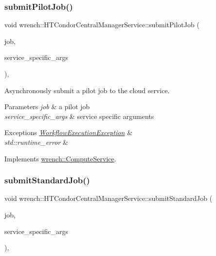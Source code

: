 \subsubsection{\texorpdfstring{submit\+Pilot\+Job()}{submitPilotJob()}}
{\footnotesize\ttfamily void wrench\+::\+H\+T\+Condor\+Central\+Manager\+Service\+::submit\+Pilot\+Job (\begin{DoxyParamCaption}\item[{\hyperlink{classwrench_1_1_pilot_job}{Pilot\+Job} $\ast$}]{job,  }\item[{std\+::map$<$ std\+::string, std\+::string $>$ \&}]{service\+\_\+specific\+\_\+args }\end{DoxyParamCaption})\hspace{0.3cm}{\ttfamily [override]}, {\ttfamily [virtual]}}



Asynchronously submit a pilot job to the cloud service. 


\begin{DoxyParams}{Parameters}
{\em job} & a pilot job \\
\hline
{\em service\+\_\+specific\+\_\+args} & service specific arguments\\
\hline
\end{DoxyParams}

\begin{DoxyExceptions}{Exceptions}
{\em \hyperlink{classwrench_1_1_workflow_execution_exception}{Workflow\+Execution\+Exception}} & \\
\hline
{\em std\+::runtime\+\_\+error} & \\
\hline
\end{DoxyExceptions}


Implements \hyperlink{classwrench_1_1_compute_service}{wrench\+::\+Compute\+Service}.

\mbox{\label{classwrench_1_1_h_t_condor_central_manager_service_a13c687548742cb39b6529e63a9b7e6a4}} 
\subsubsection{\texorpdfstring{submit\+Standard\+Job()}{submitStandardJob()}}
{\footnotesize\ttfamily void wrench\+::\+H\+T\+Condor\+Central\+Manager\+Service\+::submit\+Standard\+Job (\begin{DoxyParamCaption}\item[{\hyperlink{classwrench_1_1_standard_job}{Standard\+Job} $\ast$}]{job,  }\item[{std\+::map$<$ std\+::string, std\+::string $>$ \&}]{service\+\_\+specific\+\_\+args }\end{DoxyParamCaption})\hspace{0.3cm}{\ttfamily [override]}, {\ttfamily [virtual]}}



